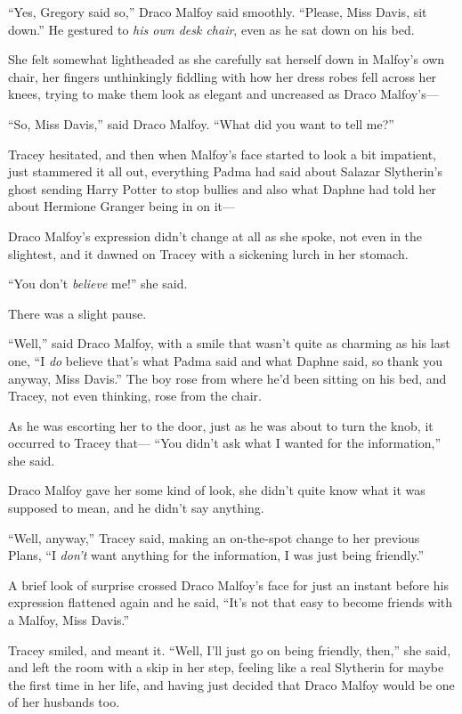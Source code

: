 ``Yes, Gregory said so,'' Draco Malfoy said smoothly. ``Please, Miss
Davis, sit down.'' He gestured to \emph{his own desk chair}, even as he
sat down on his bed.

She felt somewhat lightheaded as she carefully sat herself down in
Malfoy's own chair, her fingers unthinkingly fiddling with how her dress
robes fell across her knees, trying to make them look as elegant and
uncreased as Draco Malfoy's---

``So, Miss Davis,'' said Draco Malfoy. ``What did you want to tell me?''

Tracey hesitated, and then when Malfoy's face started to look a bit
impatient, just stammered it all out, everything Padma had said about
Salazar Slytherin's ghost sending Harry Potter to stop bullies and also
what Daphne had told her about Hermione Granger being in on it---

Draco Malfoy's expression didn't change at all as she spoke, not even in
the slightest, and it dawned on Tracey with a sickening lurch in her
stomach.

``You don't \emph{believe} me!'' she said.

There was a slight pause.

``Well,'' said Draco Malfoy, with a smile that wasn't quite as charming
as his last one, ``I \emph{do} believe that's what Padma said and what
Daphne said, so thank you anyway, Miss Davis.'' The boy rose from where
he'd been sitting on his bed, and Tracey, not even thinking, rose from
the chair.

As he was escorting her to the door, just as he was about to turn the
knob, it occurred to Tracey that--- ``You didn't ask what I wanted for
the information,'' she said.

Draco Malfoy gave her some kind of look, she didn't quite know what it
was supposed to mean, and he didn't say anything.

``Well, anyway,'' Tracey said, making an on-the-spot change to her
previous Plans, ``I \emph{don't} want anything for the information, I
was just being friendly.''

A brief look of surprise crossed Draco Malfoy's face for just an instant
before his expression flattened again and he said, ``It's not that easy
to become friends with a Malfoy, Miss Davis.''

Tracey smiled, and meant it. ``Well, I'll just go on being friendly,
then,'' she said, and left the room with a skip in her step, feeling
like a real Slytherin for maybe the first time in her life, and having
just decided that Draco Malfoy would be one of her husbands too.

